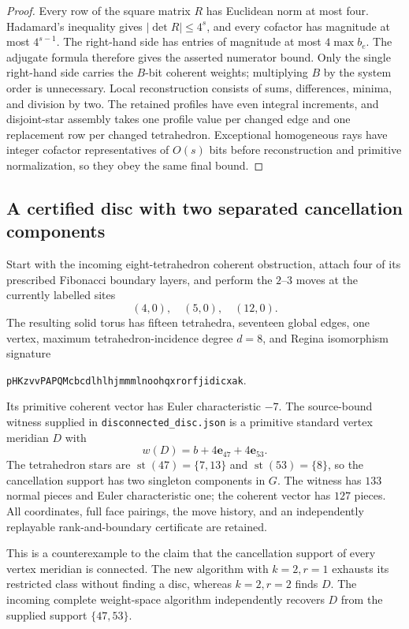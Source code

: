 \begin{proof}
Every row of the square matrix $R$ has Euclidean norm at most four.
Hadamard's inequality gives $|\det R|\le4^s$, and every cofactor has
magnitude at most $4^{s-1}$.  The right-hand side has entries of
magnitude at most $4\max b_e$.  The adjugate formula therefore gives
the asserted numerator bound.  Only the single right-hand side carries
the $B$-bit coherent weights; multiplying $B$ by the system order is
unnecessary.  Local reconstruction consists of sums, differences,
minima, and division by two.  The retained profiles have even integral
increments, and disjoint-star assembly takes one profile value per
changed edge and one replacement row per changed tetrahedron.
Exceptional homogeneous rays have integer cofactor representatives of
$O(s)$ bits before reconstruction and primitive normalization, so they
obey the same final bound.
\end{proof}

\subsection{A certified disc with two separated cancellation components}
\label{sec:cluster-counterexample}

Start with the incoming eight-tetrahedron coherent obstruction, attach
four of its prescribed Fibonacci boundary layers, and perform the
$2$--$3$ moves at the currently labelled sites
\[
                        (4,0),\quad(5,0),\quad(12,0).
\]
The resulting solid torus has fifteen tetrahedra, seventeen global edges,
one vertex, maximum tetrahedron-incidence degree $d=8$, and Regina
isomorphism signature
\begin{center}\texttt{pHKzvvPAPQMcbcdlhlhjmmmlnoohqxrorfjidicxak}.\end{center}
Its primitive coherent vector has Euler characteristic $-7$.  The
source-bound witness supplied in \texttt{disconnected\_disc.json} is a
primitive standard vertex meridian $D$ with
\[
                 w(D)=b+4\mathbf e_{47}+4\mathbf e_{53}.
\]
The tetrahedron stars are $\operatorname{st}(47)=\{7,13\}$ and
$\operatorname{st}(53)=\{8\}$, so the cancellation support has two
singleton components in $G$.  The witness has $133$ normal pieces and
Euler characteristic one; the coherent vector has $127$ pieces.  All
coordinates, full face pairings, the move history, and an independently
replayable rank-and-boundary certificate are retained.

This is a counterexample to the claim that the cancellation support of
every vertex meridian is connected.  The new algorithm with $k=2,r=1$
exhausts its restricted class without finding a disc, whereas $k=2,r=2$
finds $D$.  The incoming complete weight-space algorithm independently
recovers $D$ from the supplied support $\{47,53\}$.

